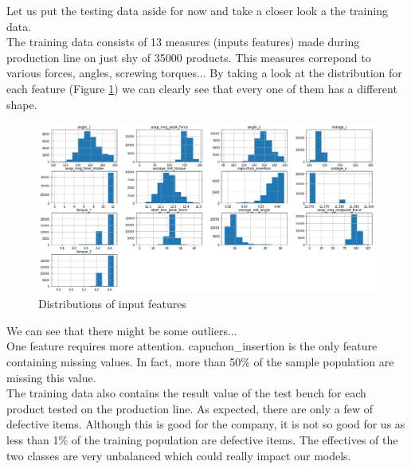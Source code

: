 Let us put the testing data aside for now and take a closer look a the training data.\\

The training data consists of 13 measures (inputs features) made during production line on just shy of 35000 products. This measures correpond to various forces, angles, screwing torques... By taking a look at the distribution for each feature (Figure \ref{data_analysis_1}) we can clearly see that every one of them has a different shape.\\

\begin{figure}
    \center
    \includegraphics[scale=.38]{img/data_analysis_1.png}
    \caption{Distributions of input features}
    \label{data_analysis_1}
\end{figure}

We can see that there might be some outliers...\\

One feature requires more attention. \textsf{capuchon\_insertion} is the only feature containing missing values. In fact, more than 50\% of the sample population are missing this value.\\


The training data also contains the result value of the test bench for each product tested on the production line. As expected, there are only a few of defective items. Although this is good for the company, it is not so good for us as less than 1\% of the training population are defective items. The effectives of the two classes are very unbalanced which could really impact our models.